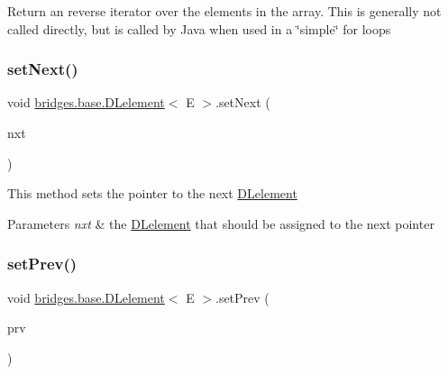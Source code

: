 Return an reverse iterator over the elements in the array. This is generally not called directly, but is called by Java when used in a \char`\"{}simple\char`\"{} for loops \mbox{\label{classbridges_1_1base_1_1_d_lelement_aa18aff21854e4fe372dfefef04b325fe}} 
\subsubsection{\texorpdfstring{set\+Next()}{setNext()}}
{\footnotesize\ttfamily void \hyperlink{classbridges_1_1base_1_1_d_lelement}{bridges.\+base.\+D\+Lelement}$<$ E $>$.set\+Next (\begin{DoxyParamCaption}\item[{\hyperlink{classbridges_1_1base_1_1_d_lelement}{D\+Lelement}$<$ E $>$}]{nxt }\end{DoxyParamCaption})}

This method sets the pointer to the next \hyperlink{classbridges_1_1base_1_1_d_lelement}{D\+Lelement}


\begin{DoxyParams}{Parameters}
{\em nxt} & the \hyperlink{classbridges_1_1base_1_1_d_lelement}{D\+Lelement} that should be assigned to the next pointer \\
\hline
\end{DoxyParams}
\mbox{\label{classbridges_1_1base_1_1_d_lelement_a152a06add922290d48b2d4affc87d592}} 
\subsubsection{\texorpdfstring{set\+Prev()}{setPrev()}}
{\footnotesize\ttfamily void \hyperlink{classbridges_1_1base_1_1_d_lelement}{bridges.\+base.\+D\+Lelement}$<$ E $>$.set\+Prev (\begin{DoxyParamCaption}\item[{\hyperlink{classbridges_1_1base_1_1_d_lelement}{D\+Lelement}$<$ E $>$}]{prv }\end{DoxyParamCaption})}

